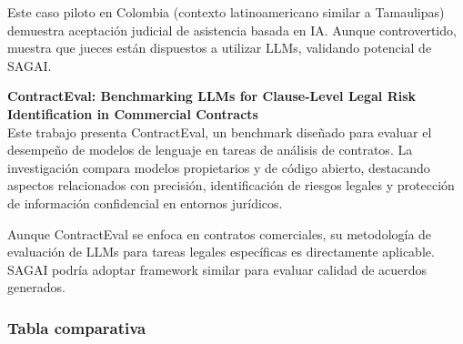 Este caso piloto en Colombia (contexto latinoamericano similar a Tamaulipas) demuestra aceptación judicial de asistencia basada en IA. Aunque controvertido, muestra que jueces están dispuestos a utilizar LLMs, validando potencial de SAGAI.
\vspace{0.3cm}

\textbf{ContractEval: Benchmarking LLMs for Clause-Level Legal Risk Identification in Commercial Contracts} \cite{ContractEval2025} \\
Este trabajo presenta ContractEval, un benchmark diseñado para evaluar el desempeño de modelos de lenguaje en tareas de análisis de contratos. La investigación compara modelos propietarios y de código abierto, destacando aspectos relacionados con precisión, identificación de riesgos legales y protección de información confidencial en entornos jurídicos.

Aunque ContractEval se enfoca en contratos comerciales, su metodología de evaluación de LLMs para tareas legales específicas es directamente aplicable. SAGAI podría adoptar framework similar para evaluar calidad de acuerdos generados.

\subsubsection{Tabla comparativa}
\label{subsec:tabla_comparativa}

